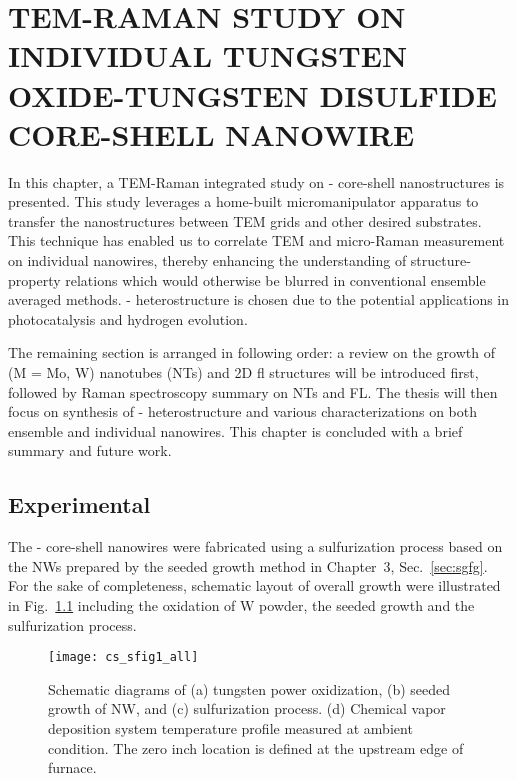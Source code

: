 \chapter{TEM-RAMAN STUDY ON INDIVIDUAL TUNGSTEN OXIDE-TUNGSTEN DISULFIDE CORE-SHELL NANOWIRE}

In this chapter, a TEM-Raman integrated study on - core-shell nanostructures is presented. This study leverages a home-built micromanipulator apparatus to transfer the nanostructures between TEM grids and other desired substrates. This technique has enabled us to correlate TEM and micro-Raman measurement on individual nanowires, thereby enhancing the understanding of structure-property relations which would otherwise be blurred in conventional ensemble averaged methods. - heterostructure is chosen due to the potential applications in photocatalysis and hydrogen evolution. 

The remaining section is arranged in following order: a review on the growth of  (M = Mo, W) nanotubes (NTs) and 2D \gls{fl} structures will be introduced first, followed by Raman spectroscopy summary on  NTs and FL. The thesis will then focus on synthesis of - heterostructure and various characterizations on both ensemble and individual nanowires. This chapter is concluded with a brief summary and future work.



\section{Experimental}

The - core-shell nanowires were fabricated using a sulfurization process based on the  NWs prepared by the seeded growth method in Chapter~3, Sec.~\ref{sec:sgfg}. For the sake of completeness, schematic layout of overall growth were illustrated in Fig.~\ref{fig:ch5grow} including the oxidation of W powder, the seeded growth and the sulfurization process.

\begin{figure}[htb]
\centering
\texttt{[image: cs\_sfig1\_all]}
\caption[Schematic diagrams of tungsten power oxidization, seeded growth of  NW, and sulfurization process.]{Schematic diagrams of (a) tungsten power oxidization, (b) seeded growth of  NW, and (c) sulfurization process. (d) Chemical vapor deposition system temperature profile measured at ambient condition. The zero inch location is defined at the upstream edge of furnace.}
\label{fig:ch5grow}
\end{figure}

